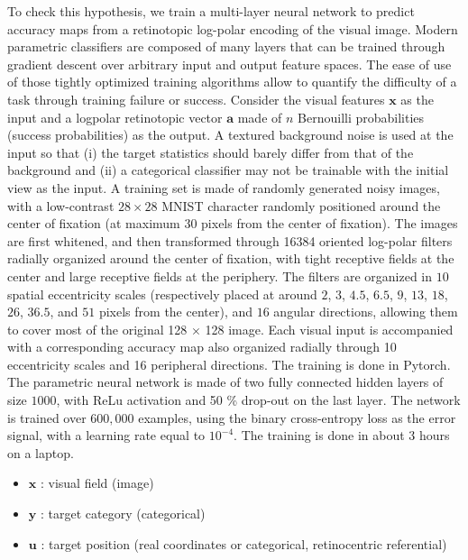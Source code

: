 \CNS
To check this hypothesis, we train a multi-layer neural network to predict accuracy maps from a retinotopic log-polar encoding of the visual image. Modern parametric classifiers are composed of many layers that can be trained through gradient descent over arbitrary input and output feature spaces\CNS  {\bf [REF?]}\fi. The ease of use of those tightly optimized training algorithms allow to quantify the difficulty of a task through training failure or success. Consider the visual features  $\boldsymbol{x}$ as the input and a logpolar retinotopic vector $\boldsymbol{a}$ made of $n$ Bernouilli probabilities (success probabilities) as the output. A textured background noise is used at the input so that (i) the target statistics should barely differ from that of the background and (ii) a  categorical classifier may not be trainable with the initial view as the input. A training set is made of randomly generated noisy images, with a low-contrast $28\times 28$ MNIST character \CNS  {\bf [REF?]}\fi randomly positioned around the center of fixation (at maximum 30 pixels from the center of fixation). The images are first whitened\CNS  {\bf [REF?]}\fi, and then transformed through 16384 oriented log-polar filters radially organized around the center of fixation, with tight receptive fields at the center and large receptive fields at the periphery. The filters are organized in $10$ spatial eccentricity scales (respectively placed at around $2$, $3$, $4.5$, $6.5$, $9$, $13$, $18$, $26$, $36.5$, and $51$ pixels from the center), and $16$ angular directions, allowing them to cover most of the original 128 $\times$ 128 image. Each visual input is accompanied with a corresponding accuracy map also organized radially through 10 eccentricity scales and 16 peripheral directions. The training is done in Pytorch\CNS  {\bf [REF?]}\fi. The parametric neural network is made of two fully connected hidden layers of size $1000$, with ReLu activation and 50 \% drop-out on the last layer. The network is trained over $600,000$ examples, using the binary cross-entropy loss as the error signal, with a learning rate equal to $10^{-4}$. The training is done in about 3 hours on a laptop.  


\fi



\CNS

\begin{itemize}
	\item $\boldsymbol{x}$ : visual field (image)
	\item $\boldsymbol{y}$ : target category (categorical)
	\item $\boldsymbol{u}$ : target position (real coordinates or categorical, retinocentric referential)

\end{itemize}

